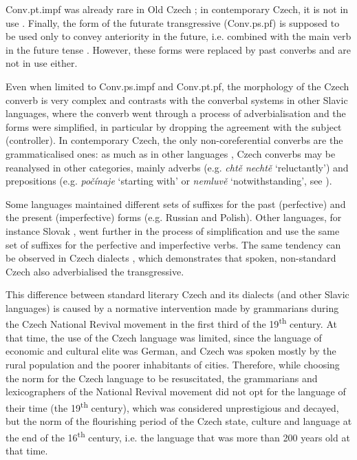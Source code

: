 \documentclass[output=paper,russian]{langsci/langscibook}
\begin{document}
Conv.pt.impf was already rare in Old Czech \parencite[115]{dvorak70}; in contemporary Czech, it is not in use \parencite[154]{komarek86}. Finally, the form of the futurate transgressive (Conv.ps.pf) is supposed to be used only to convey anteriority in the future, i.e. combined with the main verb in the future tense \parencites[see][126]{nedjalkov95}[154]{komarek86}. However, these forms were replaced by past converbs \parencite[Conv.pt.pf, see][261]{oktabec53} and are not in use either.

Even when limited to Conv.ps.impf and Conv.pt.pf, the morphology of the Czech converb is very complex and contrasts with the converbal systems in other Slavic languages, where the converb went through a process of adverbialisation and the forms were simplified, in particular by dropping the agreement with the subject (controller). In contemporary Czech, the only non-coreferential converbs are the grammaticalised ones: as much as in other languages \parencite[see][27--41]{haspelmath95}, Czech converbs may be reanalysed in other categories, mainly adverbs (e.g. \textit{chtě nechtě} `reluctantly') and prepositions (e.g. \textit{počínaje} `starting with' or \textit{nemluvě} `notwithstanding', see \cite[156]{komarek86}). 

Some languages maintained different sets of suffixes for the past (perfective) and the present (imperfective) forms (e.g. Russian and Polish). Other languages, for instance Slovak \parencite[487]{dvonc66}, went further in the process of simplification and use the same set of suffixes for the perfective and imperfective verbs. The same tendency can be observed in Czech dialects \parencites[55--56]{dvorak83}{michalkova63}, which demonstrates that spoken, non-standard Czech also adverbialised the transgressive.

This difference between standard literary Czech and its dialects (and other Slavic languages) is caused by a normative intervention made by grammarians during the Czech National Revival movement in the first third of the 19\textsuperscript{th} century. At that time, the use of the Czech language was limited, since the language of economic and cultural elite was German, and Czech was spoken mostly by the rural population and the poorer inhabitants of cities. Therefore, while choosing the norm for the Czech language to be resuscitated, the grammarians and lexicographers of the National Revival movement did not opt for the language of their time (the 19\textsuperscript{th} century), which was considered unprestigious and decayed, but the norm of the flourishing period of the Czech state, culture and language at the end of the 16\textsuperscript{th} century, i.e. the language that was more than 200 years old at that time. 
\end{document}
